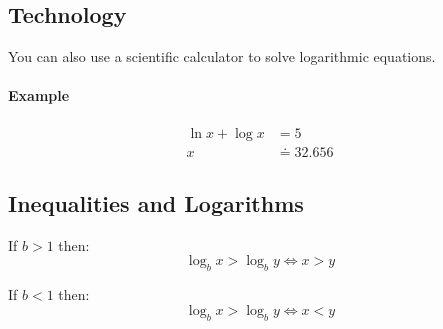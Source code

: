 		\subsection{Technology}
			You can also use a scientific calculator to solve logarithmic equations.
			\paragraph{Example}
				\begin{align*}
					\ln x + \log x &= 5\\
					x &\doteq 32.656
				\end{align*}
		\subsection{Inequalities and Logarithms}
			If $b>1$ then:
			\[\log_b x > \log_b y \iff x > y\]

			If $b<1$ then:
			\[\log_b x > \log_b y \iff x < y\]
